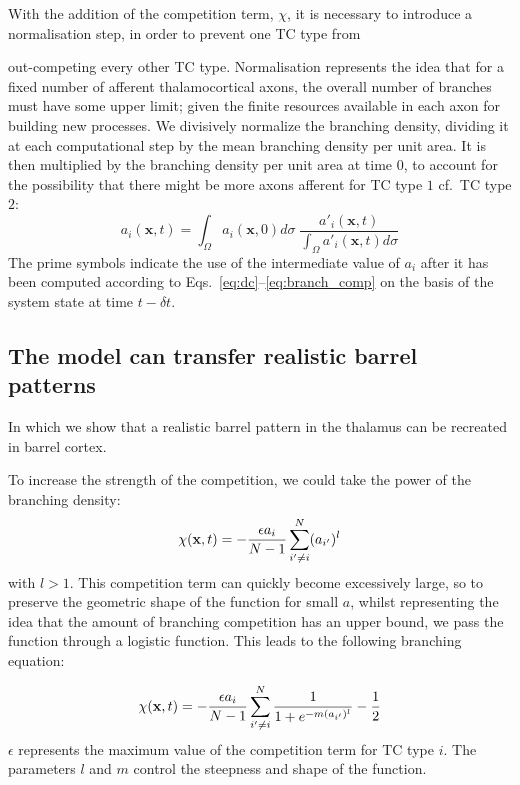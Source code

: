 \documentclass[9pt,twocolumn,twoside,lineno]{pnas-new}
\begin{document}
With the addition of the competition term, $\chi$, it is necessary to
introduce a normalisation step, in order to prevent one TC type from
{out-competing every other TC type. Normalisation represents the idea
that for a fixed number of afferent thalamocortical axons, the overall
number of branches must have some upper limit; given the finite
resources available in each axon for building new processes. We
divisively normalize the branching density, dividing it at each
computational step by the mean branching density per unit area. It is
then multiplied by the branching density per unit area at time 0, to
account for the possibility that there might be more axons afferent
for TC type $1$ cf.~TC type $2$:
%
\begin{equation} \label{eq:norm}
  a_i(\mathbf{x}, t) = \int_\Omega  a_i(\mathbf{x}, 0) d\sigma \; \frac {a'_i(\mathbf{x}, t)} {\int_\Omega
  a'_i(\mathbf{x}, t) d\sigma}
\end{equation}
%
The prime symbols indicate the use of the intermediate value of $a_i$
after it has been computed according to Eqs.~\ref{eq:dc}--\ref{eq:branch_comp}
on the basis of the system state at time $t-{\delta}t$.

\subsection*{The model can transfer realistic barrel patterns}

In which we show that a realistic barrel pattern in the thalamus can be
recreated in barrel cortex.


To increase the strength of the competition, we could take the power
of the branching density:
%
\begin{equation} \label{eq:branch_comp_pow}
\chi(\mathbf{x}, t) = - \frac{\epsilon  a_i}{N-1} \sum_{i' \ne i}^{N} (a_{i'})^l
\end{equation}
%
with $l>1$. This competition term can quickly become excessively large, so to
preserve the geometric shape of the function for small $a$, whilst
representing the idea that the amount of branching competition has an upper
bound, we pass the function through a logistic function.  This leads to the
following branching equation:

%
\begin{equation} \label{eq:branch_comp_pow_logistic}
\chi(\mathbf{x}, t) = - \frac{\epsilon a_i}{N-1} \sum_{i' \ne i}^{N}
\frac{1}{1 + e^{-m (a_{i'})^l}} - \frac{1}{2}
\end{equation}
%
$\epsilon$ represents the maximum value of the competition term for TC type
$i$. The parameters $l$ and $m$ control the steepness and shape of the
function.

}
\end{document}
